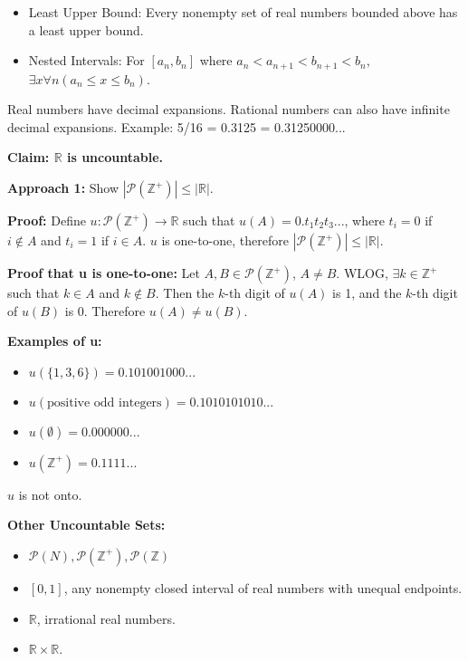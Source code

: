 \documentclass{article}
\begin{document}
\begin{multicols}{3}
\begin{itemize}[nosep, topsep=0pt, itemsep=0pt, leftmargin=10pt]
    \item Least Upper Bound: Every nonempty set of real numbers bounded above has a least upper bound.
    \item Nested Intervals: For $[a_n, b_n]$ where $a_n < a_{n+1} < b_{n+1} < b_n$, $\exists x \forall n (a_n \leq x \leq b_n)$.
\end{itemize}

\noindent Real numbers have decimal expansions. Rational numbers can also have infinite decimal expansions. Example: 5/16 = 0.3125 = 0.31250000...

\noindent\textbf{Claim: $\mathbb{R}$ is uncountable.}

\noindent\textbf{Approach 1:} Show $|\mathcal{P}(\mathbb{Z}^+)| \leq |\mathbb{R}|$.

\noindent\textbf{Proof:} Define $u: \mathcal{P}(\mathbb{Z}^+) \to \mathbb{R}$ such that $u(A) = 0.t_1 t_2 t_3 ...$, where $t_i = 0$ if $i \notin A$ and $t_i = 1$ if $i \in A$. $u$ is one-to-one, therefore $|\mathcal{P}(\mathbb{Z}^+)| \leq |\mathbb{R}|$.

\noindent\textbf{Proof that u is one-to-one:} Let $A, B \in \mathcal{P}(\mathbb{Z}^+)$, $A \neq B$.  WLOG, $\exists k \in \mathbb{Z}^+$ such that $k \in A$ and $k \notin B$.  Then the $k$-th digit of $u(A)$ is 1, and the $k$-th digit of $u(B)$ is 0. Therefore $u(A) \neq u(B)$.

\noindent\textbf{Examples of u:}

\begin{itemize}[nosep, topsep=0pt, itemsep=0pt, leftmargin=10pt]
    \item $u(\{1, 3, 6\}) = 0.101001000...$
    \item $u(\text{positive odd integers}) = 0.1010101010...$
    \item $u(\emptyset) = 0.000000...$
    \item $u(\mathbb{Z}^+) = 0.1111...$
\end{itemize}

\noindent $u$ is not onto.

\noindent\textbf{Other Uncountable Sets:}

\begin{itemize}[nosep, topsep=0pt, itemsep=0pt, leftmargin=10pt]
    \item $\mathcal{P}(N), \mathcal{P}(\mathbb{Z}^+), \mathcal{P}(\mathbb{Z})$
    \item $[0,1]$, any nonempty closed interval of real numbers with unequal endpoints.
    \item $\mathbb{R}$, irrational real numbers.
    \item $\mathbb{R} \times \mathbb{R}$.
\end{itemize}


\end{multicols}
\end{document}

